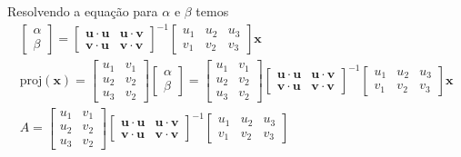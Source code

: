 \documentclass{beamer}
\begin{document}
\begin{frame}
  Resolvendo a equação para $\alpha$ e $\beta$ temos
  \begin{gather*}
\begin{bmatrix}
  \alpha \\ \beta
\end{bmatrix} = \begin{bmatrix}
  \mathbf{u}\cdot\mathbf{u} & \mathbf{u}\cdot\mathbf{v} \\
  \mathbf{v}\cdot\mathbf{u} & \mathbf{v}\cdot\mathbf{v}
\end{bmatrix}^{-1} \begin{bmatrix}
  u_1 & u_2 & u_3 \\
  v_1 & v_2 & v_3 
\end{bmatrix} \mathbf{x}  \\
\text{proj}(\mathbf{x})=
 \begin{bmatrix}
  u_1 & v_1 \\ u_2 & v_2 \\ u_3 & v_2
\end{bmatrix} \begin{bmatrix}
  \alpha \\ \beta
\end{bmatrix} = \begin{bmatrix}
  u_1 & v_1 \\ u_2 & v_2 \\ u_3 & v_2
\end{bmatrix}\begin{bmatrix}
  \mathbf{u}\cdot\mathbf{u} & \mathbf{u}\cdot\mathbf{v} \\
  \mathbf{v}\cdot\mathbf{u} & \mathbf{v}\cdot\mathbf{v}
\end{bmatrix}^{-1} \begin{bmatrix}
  u_1 & u_2 & u_3 \\
  v_1 & v_2 & v_3 
\end{bmatrix} \mathbf{x} \\
A= \begin{bmatrix}
  u_1 & v_1 \\ u_2 & v_2 \\ u_3 & v_2
\end{bmatrix}\begin{bmatrix}
  \mathbf{u}\cdot\mathbf{u} & \mathbf{u}\cdot\mathbf{v} \\
  \mathbf{v}\cdot\mathbf{u} & \mathbf{v}\cdot\mathbf{v}
\end{bmatrix}^{-1} \begin{bmatrix}
  u_1 & u_2 & u_3 \\
  v_1 & v_2 & v_3 
\end{bmatrix}
\end{gather*}
\end{frame}
\end{document}
